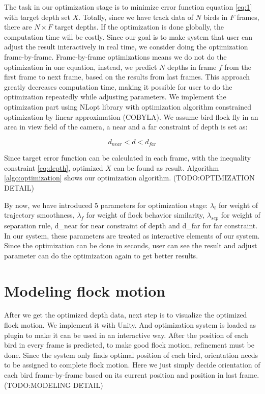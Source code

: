 The task in our optimization stage is to minimize error function equation \ref{eq:1} with target depth set $X$. Totally, since we have track data of $N$ birds in $F$ frames, there are $N{\times}F$ target depths. If the optimization is done globally, the computation time will be costly. Since our goal is to make system that user can adjust the result interactively in real time, we consider doing the optimization frame-by-frame.
Frame-by-frame optimizations means we do not do the optimization in one equation, instead, we predict $N$ depths in frame $f$ from the first frame to next frame, based on the results from last frames. This approach greatly decreases computation time, making it possible for user to do the optimization repeatedly while adjusting parameters.
We implement the optimization part using NLopt library \cite{NLopt} with optimization algorithm constrained optimization by linear approximation (COBYLA)\cite{COBYLA}. We assume bird flock fly in an area in view field of the camera, a near and a far constraint of depth is set as:


\begin{equation}\label{eq:depth}
d_{near} < d < d_{far}
\end{equation}

Since target error function can be calculated in each frame, with the inequality constraint \ref{eq:depth}, optimized $X$ can be found as result.  Algorithm \ref{algo:optimization}  shows our optimization algorithm.
(TODO:OPTIMIZATION DETAIL)


By now, we have introduced 5 parameters for optimization stage: $\lambda_{t}$ for weight of trajectory smoothness, $\lambda_{f}$ for weight of flock behavior similarity, $\lambda_{sep}$ for weight of separation rule, d_{near} for near constraint of depth and d_{far} for far constraint. In our system, these parameters are treated as interactive elements of our system. Since the optimization can be done in seconds, user can see the result and adjust parameter can do the optimization again to get better results. 


\section{Modeling flock motion}


After we get the optimized depth data, next step is to visualize the optimized flock motion. We implement it with Unity\cite{Unity}. And optimization system is loaded as plugin to make it can be used in an interactive way.
After the position of each bird in every frame is predicted, to make good flock motion, refinement must be done. Since the system only finds optimal position of each bird, orientation needs to be assigned to complete flock motion. Here we just simply decide orientation of each bird frame-by-frame based on its current position and position in last frame.
(TODO:MODELING DETAIL)
